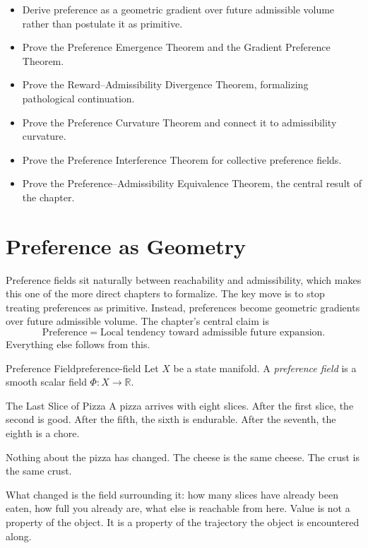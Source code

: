 \documentclass[12pt,twoside,openright]{book}
\newenvironment{objectives}{%
  \begin{tcolorbox}[colback=DistBlue!5,colframe=DistBlue,
    title={\faCheckCircle\enspace Learning Objectives},
    fonttitle=\sffamily\bfseries\color{white},
    attach boxed title to top left={yshift=-2mm,xshift=4mm},
    boxed title style={colback=DistBlue},breakable]
  \begin{itemize}[leftmargin=*,nosep]}{%
  \end{itemize}\end{tcolorbox}\vspace{1em}}
\begin{document}
\begin{objectives}
  \item Derive preference as a geometric gradient over
        future admissible volume rather than postulate it
        as primitive.
  \item Prove the Preference Emergence Theorem and the
        Gradient Preference Theorem.
  \item Prove the Reward--Admissibility Divergence Theorem,
        formalizing pathological continuation.
  \item Prove the Preference Curvature Theorem and connect
        it to admissibility curvature.
  \item Prove the Preference Interference Theorem for
        collective preference fields.
  \item Prove the Preference--Admissibility Equivalence
        Theorem, the central result of the chapter.
\end{objectives}

\section{Preference as Geometry}
\label{sec:ch22-geometry}

Preference fields sit naturally between reachability and
admissibility, which makes this one of the more direct
chapters to formalize. The key move is to stop treating
preferences as primitive. Instead, preferences become
geometric gradients over future admissible volume. The
chapter's central claim is
\[
  \text{Preference} =
  \text{Local tendency toward admissible future expansion}.
\]
Everything else follows from this.

\begin{definition}{Preference Field}{preference-field}
  Let $X$ be a state manifold. A \emph{preference field} is
  a smooth scalar field $\Phi : X \to \mathbb{R}$.
\end{definition}

\begin{distinctionaside}{The Last Slice of Pizza}
A pizza arrives with eight slices. After the first slice, the
second is good. After the fifth, the sixth is endurable.
After the seventh, the eighth is a chore.

Nothing about the pizza has changed. The cheese is the same
cheese. The crust is the same crust.

What changed is the field surrounding it: how many slices
have already been eaten, how full you already are, what else
is reachable from here. Value is not a property of the
object. It is a property of the trajectory the object is
encountered along.
\end{distinctionaside}
\end{document}
